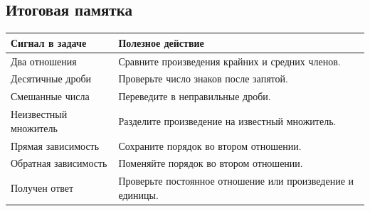 \documentclass[a4paper,12pt]{article}
\begin{document}
\subsection*{Итоговая памятка}
\begin{center}
\renewcommand{\arraystretch}{1.18}
\begin{tabularx}{\linewidth}{@{}p{.36\linewidth}X@{}}
\toprule
Сигнал в задаче & Полезное действие\\\midrule
Два отношения & Сравните произведения крайних и средних членов.\\
Десятичные дроби & Проверьте число знаков после запятой.\\
Смешанные числа & Переведите в неправильные дроби.\\
Неизвестный множитель & Разделите произведение на известный множитель.\\
Прямая зависимость & Сохраните порядок во втором отношении.\\
Обратная зависимость & Поменяйте порядок во втором отношении.\\
Получен ответ & Проверьте постоянное отношение или произведение и единицы.\\
\bottomrule
\end{tabularx}
\end{center}
\end{document}
